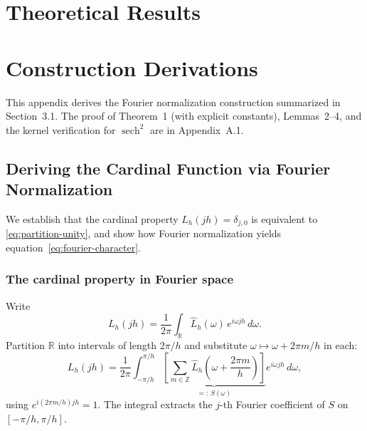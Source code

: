 \documentclass{article}
\begin{document}
\appendix

\section{Theoretical Results}




\section{Construction Derivations}
\label{app:construction-derivations}

This appendix derives the Fourier normalization construction summarized in Section~3.1. The proof of Theorem~1 (with explicit constants), Lemmas~2--4, and the kernel verification for \(\operatorname{sech}^2\) are in Appendix~A.1.

\subsection{Deriving the Cardinal Function via Fourier Normalization}
\label{app:fourier-normalization}

We establish that the cardinal property \(L_h(jh) = \delta_{j,0}\) is equivalent to \eqref{eq:partition-unity}, and show how Fourier normalization yields equation~\eqref{eq:fourier-character}.

\subsubsection{The cardinal property in Fourier space}

Write
\[
L_h(jh) = \frac{1}{2\pi} \int_{\mathbb{R}} \widehat{L}_h(\omega)\, e^{i\omega jh}\, d\omega.
\]
Partition \(\mathbb{R}\) into intervals of length \(2\pi/h\) and substitute \(\omega \mapsto \omega + 2\pi m/h\) in each:
\[
L_h(jh)
=
\frac{1}{2\pi}
\int_{-\pi/h}^{\pi/h}
\underbrace{
\left[
\sum_{m \in \mathbb{Z}}
\widehat{L}_h\!\left(\omega + \frac{2\pi m}{h}\right)
\right]
}_{=: \, S(\omega)}
e^{i\omega jh}\, d\omega,
\]
using \(e^{i(2\pi m/h)jh} = 1\). The integral extracts the \(j\)-th Fourier coefficient of \(S\) on \([-\pi/h,\pi/h]\).
\end{document}
